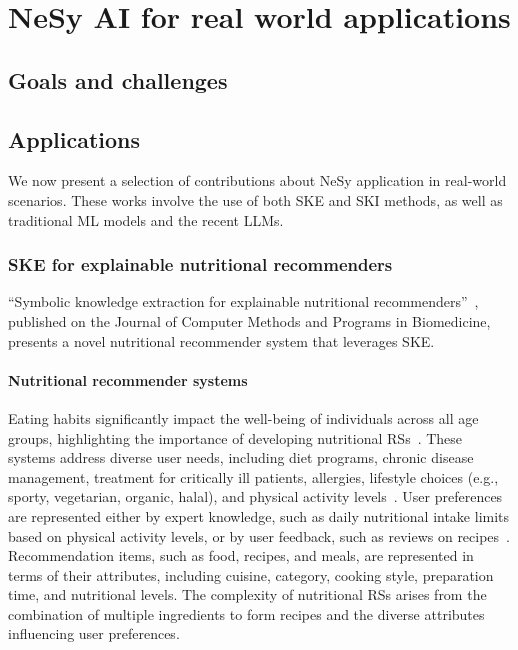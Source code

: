 
\chapter{NeSy AI for real world applications}
\label{ch:nesy-ai-for-real-world-applications}
\mtcaddchapter
\minitoc

\section{Goals and challenges}\label{sec:nesy-ai-goals-and-challenges}

\section{Applications}\label{sec:nesy-ai-applications}
%
We now present a selection of contributions about \gls{NeSy} application in real-world scenarios.
%
These works involve the use of both \gls{SKE} and \gls{SKI} methods, as well as traditional \gls{ML} models and the recent \glspl{LLM}.



\subsection{\Gls{SKE} for explainable nutritional recommenders}\label{subsec:ske-for-explainable-nutritional-recommenders}
%
``Symbolic knowledge extraction for explainable nutritional recommenders''~\cite{DBLP:journals/cmpb/MagniniCCAO23}, published on the Journal of Computer Methods and Programs in Biomedicine, presents a novel nutritional recommender system that leverages \gls{SKE}.


\subsubsection{Nutritional recommender systems}\label{subsubsec:nutritional-recommender-systems}

Eating habits significantly impact the well-being of individuals across all age groups, highlighting the importance of developing nutritional \glspl{RS}~\cite{EspinHN2016,Cioara2018,Shandilya2022}.
%
These systems address diverse user needs, including diet programs, chronic disease management, treatment for critically ill patients, allergies, lifestyle choices (e.g., sporty, vegetarian, organic, halal), and physical activity levels~\cite{Saiz2021,Hezarjaribi2019,AgapitoSCCLGPFC2018,FraserT1990,Tran2018}.
%
User preferences are represented either by expert knowledge, such as daily nutritional intake limits based on physical activity levels, or by user feedback, such as reviews on recipes~\cite{10.1145/3418211}.
%
Recommendation items, such as food, recipes, and meals, are represented in terms of their attributes, including cuisine, category, cooking style, preparation time, and nutritional levels.
%
The complexity of nutritional \glspl{RS} arises from the combination of multiple ingredients to form recipes and the diverse attributes influencing user preferences.

